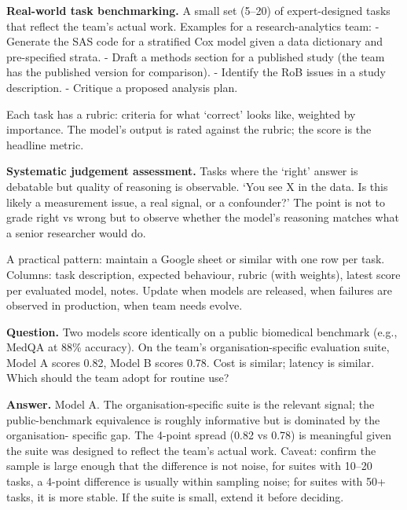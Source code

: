 \documentclass[
  letterpaper,
  11pt]{scrbook}
\begin{document}
\textbf{Real-world task benchmarking.} A small set (5--20) of
expert-designed tasks that reflect the team's actual work. Examples for
a research-analytics team: - Generate the SAS code for a stratified Cox
model given a data dictionary and pre-specified strata. - Draft a
methods section for a published study (the team has the published
version for comparison). - Identify the RoB issues in a study
description. - Critique a proposed analysis plan.

Each task has a rubric: criteria for what `correct' looks like, weighted
by importance. The model's output is rated against the rubric; the score
is the headline metric.

\textbf{Systematic judgement assessment.} Tasks where the `right' answer
is debatable but quality of reasoning is observable. `You see X in the
data. Is this likely a measurement issue, a real signal, or a
confounder?' The point is not to grade right vs wrong but to observe
whether the model's reasoning matches what a senior researcher would do.

A practical pattern: maintain a Google sheet or similar with one row per
task. Columns: task description, expected behaviour, rubric (with
weights), latest score per evaluated model, notes. Update when models
are released, when failures are observed in production, when team needs
evolve.

\begin{tcolorbox}[enhanced jigsaw, arc=.35mm, bottomrule=.15mm, bottomtitle=1mm, breakable, colback=white, colbacktitle=quarto-callout-note-color!10!white, colframe=quarto-callout-note-color-frame, coltitle=black, left=2mm, leftrule=.75mm, opacityback=0, opacitybacktitle=0.6, rightrule=.15mm, title={Check your understanding: vibes vs benchmarks}, titlerule=0mm, toprule=.15mm, toptitle=1mm]

\textbf{Question.} Two models score identically on a public biomedical
benchmark (e.g., MedQA at 88\% accuracy). On the team's
organisation-specific evaluation suite, Model A scores 0.82, Model B
scores 0.78. Cost is similar; latency is similar. Which should the team
adopt for routine use?

\textbf{Answer.} Model A. The organisation-specific suite is the
relevant signal; the public-benchmark equivalence is roughly informative
but is dominated by the organisation- specific gap. The 4-point spread
(0.82 vs 0.78) is meaningful given the suite was designed to reflect the
team's actual work. Caveat: confirm the sample is large enough that the
difference is not noise, for suites with 10--20 tasks, a 4-point
difference is usually within sampling noise; for suites with 50+ tasks,
it is more stable. If the suite is small, extend it before deciding.

\end{tcolorbox}
\end{document}
